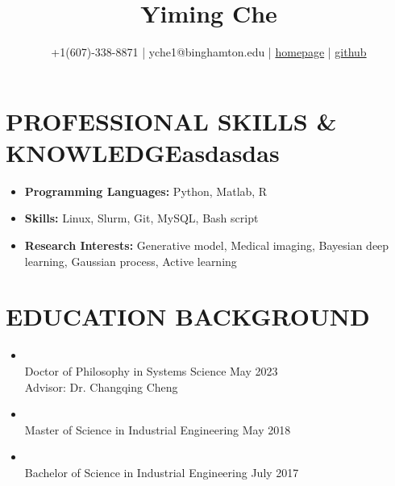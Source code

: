 \documentclass[10pt]{article}
\title{\bf  Yiming Che \vspace{-0.6em}}
\author{+1(607)-338-8871 | yche1@binghamton.edu | \href{https://soloche.github.io}{homepage} | \href{https://github.com/SoloChe}{github}}
\date{}
\begin{document}
	\maketitle

\vspace{-5em}

\section*{PROFESSIONAL SKILLS \& KNOWLEDGEasdasdas}
 \begin{itemize}	
 	\item {\bf Programming Languages:} Python, Matlab, R%
 	\item {\bf Skills:} Linux, Slurm, Git, MySQL, Bash script
 	\item {\bf Research Interests:} Generative model, Medical imaging, Bayesian deep learning, Gaussian process, Active learning
 \end{itemize}

\section*{EDUCATION BACKGROUND}
\begin{itemize}
		\item {}                                                           
		\\Doctor of Philosophy in Systems Science \hfill May 2023 
		\\Advisor: Dr. Changqing Cheng

	\item {}                                                           
	\\Master of Science in Industrial Engineering \hfill  May 2018
	
    \item {}
            \\Bachelor of Science in Industrial Engineering \hfill July 2017 
\end{itemize}
\end{document}
